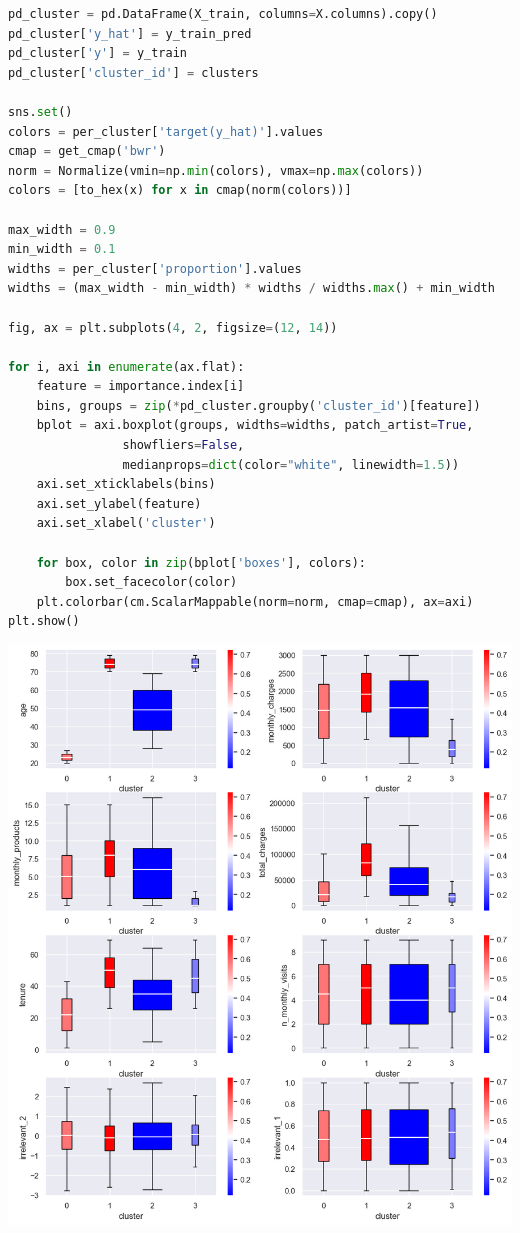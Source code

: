\documentclass{article}
\begin{document}
\begin{lstlisting}[language=Python]
pd_cluster = pd.DataFrame(X_train, columns=X.columns).copy()
pd_cluster['y_hat'] = y_train_pred
pd_cluster['y'] = y_train
pd_cluster['cluster_id'] = clusters

sns.set()
colors = per_cluster['target(y_hat)'].values
cmap = get_cmap('bwr')
norm = Normalize(vmin=np.min(colors), vmax=np.max(colors))
colors = [to_hex(x) for x in cmap(norm(colors))]

max_width = 0.9
min_width = 0.1
widths = per_cluster['proportion'].values
widths = (max_width - min_width) * widths / widths.max() + min_width

fig, ax = plt.subplots(4, 2, figsize=(12, 14))
    
for i, axi in enumerate(ax.flat):
    feature = importance.index[i]
    bins, groups = zip(*pd_cluster.groupby('cluster_id')[feature])
    bplot = axi.boxplot(groups, widths=widths, patch_artist=True, 
                showfliers=False, 
                medianprops=dict(color="white", linewidth=1.5))
    axi.set_xticklabels(bins)
    axi.set_ylabel(feature)
    axi.set_xlabel('cluster')
    
    for box, color in zip(bplot['boxes'], colors):
        box.set_facecolor(color)
    plt.colorbar(cm.ScalarMappable(norm=norm, cmap=cmap), ax=axi)
plt.show()
\end{lstlisting}

\begin{center}
\includegraphics[width=1\textwidth]{dendrogram_depth3_thres060_features}
\end{center}
\end{document}
